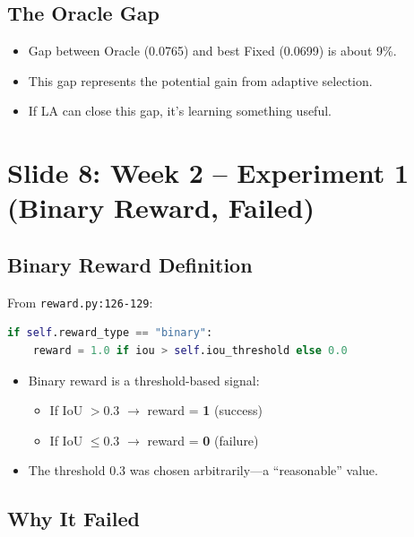 \documentclass[11pt]{article}
\newenvironment{talkingpoints}{%
  \begin{itemize}[leftmargin=1.5em, itemsep=0.3em]
}{%
  \end{itemize}
}
\begin{document}
\subsection{The Oracle Gap}

\begin{talkingpoints}
  \item Gap between Oracle (0.0765) and best Fixed (0.0699) is about 9\%.
  \item This gap represents the potential gain from adaptive selection.
  \item If LA can close this gap, it's learning something useful.
\end{talkingpoints}

\section{Slide 8: Week 2 -- Experiment 1 (Binary Reward, Failed)}

\subsection{Binary Reward Definition}

From \texttt{reward.py:126-129}:

\begin{lstlisting}[language=Python]
if self.reward_type == "binary":
    reward = 1.0 if iou > self.iou_threshold else 0.0
\end{lstlisting}

\begin{talkingpoints}
  \item Binary reward is a threshold-based signal:
  \begin{itemize}
    \item If IoU $> 0.3$ $\rightarrow$ reward = \textbf{1} (success)
    \item If IoU $\leq 0.3$ $\rightarrow$ reward = \textbf{0} (failure)
  \end{itemize}
  \item The threshold 0.3 was chosen arbitrarily---a ``reasonable'' value.
\end{talkingpoints}

\subsection{Why It Failed}
\end{document}
